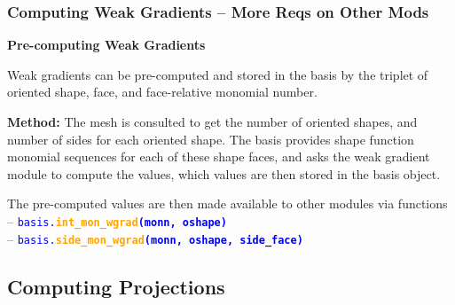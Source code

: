 \documentclass[compress]{beamer}
\begin{document}
\begin{frame}
  \frametitle{Computing Weak Gradients -- More Reqs on Other Mods}
 
  \vspace{-.4cm}
  \textbf{Pre-computing Weak Gradients}
  \vspace{.2cm}

  Weak gradients can be pre-computed and stored in the basis by the triplet of oriented shape, face,
    and face-relative monomial number.

  \pause
  \uncover<+-> {
  \vspace{.2cm}
  \textbf{Method:}
    The mesh is consulted to get the number of oriented shapes, and number of sides for each oriented shape. The basis
    provides shape function monomial sequences for each of these shape faces, and asks the weak gradient module to compute the
    values, which values are then stored in the basis object.
 
  \vspace{.15cm}
  \uncover<+-> {
  The pre-computed values are then made available to other modules via functions\\
    -- {\small \texttt{\textcolor{blue}{basis.\textbf{\textcolor{orange}{int\_mon\_wgrad}(monn, oshape)}}}}\\
    -- {\small \texttt{\textcolor{blue}{basis.\textbf{\textcolor{orange}{side\_mon\_wgrad}(monn, oshape, side\_face)}}}}
  }}
\end{frame}
 
\subsection{Computing Projections}
\end{document}

